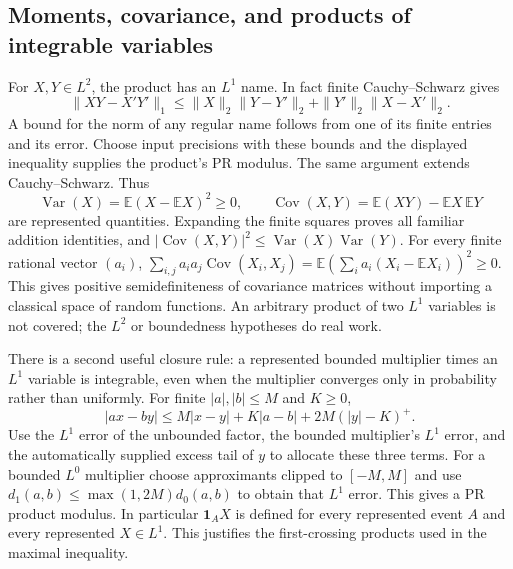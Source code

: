 \subsection{Moments, covariance, and products of integrable variables}

For $X,Y\in L^2$, the product has an $L^1$ name. In fact finite
Cauchy--Schwarz gives
\[
 \|XY-X'Y'\|_1
 \le\|X\|_2\|Y-Y'\|_2+\|Y'\|_2\|X-X'\|_2.
\]
A bound for the norm of any regular name follows from one of its finite
entries and its error. Choose input precisions with these bounds and the
displayed inequality supplies the product's PR modulus. The same argument
extends Cauchy--Schwarz. Thus
\[
 \operatorname{Var}(X)=\mathbb E(X-\mathbb EX)^2\ge0,
 \qquad
 \operatorname{Cov}(X,Y)=\mathbb E(XY)-\mathbb EX\,\mathbb EY
\]
are represented quantities. Expanding the finite squares proves all familiar
addition identities, and
$|\operatorname{Cov}(X,Y)|^2\le\operatorname{Var}(X)\operatorname{Var}(Y)$.
For every finite rational vector $(a_i)$,
$\sum_{i,j}a_i a_j\operatorname{Cov}(X_i,X_j)
=\mathbb E(\sum_i a_i(X_i-\mathbb EX_i))^2\ge0$.
This gives positive semidefiniteness of covariance matrices without importing
a classical space of random functions. An arbitrary product of two $L^1$
variables is not covered; the $L^2$ or boundedness hypotheses do real work.

There is a second useful closure rule: a represented bounded multiplier times
an $L^1$ variable is integrable, even when the multiplier converges only in
probability rather than uniformly. For finite $|a|,|b|\le M$ and $K\ge0$,
\[
 |ax-by|\le M|x-y|+K|a-b|+2M(|y|-K)^+.
\]
Use the $L^1$ error of the unbounded factor, the bounded multiplier's $L^1$
error, and the automatically supplied excess tail of $y$ to allocate these
three terms. For a bounded $L^0$ multiplier choose approximants clipped to
$[-M,M]$ and use $d_1(a,b)\le\max(1,2M)d_0(a,b)$ to obtain that $L^1$
error. This gives a PR product modulus. In particular $\mathbf1_A X$
is defined for every represented event $A$ and every represented $X\in L^1$.
This justifies the first-crossing products used in the maximal inequality.
